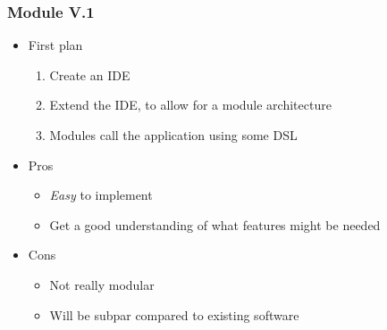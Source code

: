 \begin{frame}
  \frametitle{Module V.1}
  \begin{itemize}
    \item First plan
      \pause
      \begin{enumerate}
        \item Create an IDE
          \pause
        \item Extend the IDE, to allow for a module architecture
          \pause
        \item Modules call the application using some DSL
          \pause
      \end{enumerate}
    \item Pros
      \pause
      \begin{itemize}
        \item \textit{Easy} to implement
          \pause
        \item Get a good understanding of what features might be needed
          \pause
      \end{itemize}
    \item Cons
      \pause
      \begin{itemize}
        \item Not really modular
          \pause
        \item Will be subpar compared to existing software
      \end{itemize}
  \end{itemize}
\end{frame}

